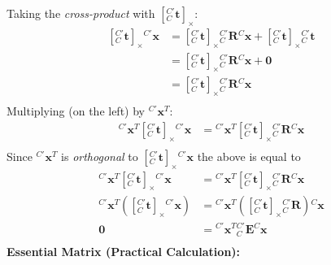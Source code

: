 \documentclass[a4paper,10pt]{article}
\newcommand{\spppnhx}[3]{\ensuremath{{^{#1}_{#2}}\mathbf{{{#3}}}}}
\begin{document}
\newline\noindent\newline\noindent
Taking the \emph{cross-product} with $[\spppnhx{C'}{C}{t}]_{\times}$:
\newline\noindent\newline\noindent
\begin{equation*}
\begin{split}
{[\spppnhx{C'}{C}{t}]_{\times}}{^{C'}\mathbf{x}} &= 
{[\spppnhx{C'}{C}{t}]_{\times}}{\spppnhx{C'}{C}{R}}{^{C}\mathbf{x}}+
{[\spppnhx{C'}{C}{t}]_{\times}}{\spppnhx{C'}{C}{t}}\\
&={[\spppnhx{C'}{C}{t}]_{\times}}{\spppnhx{C'}{C}{R}}{^{C}\mathbf{x}}+\mathbf{0}\\
&={[\spppnhx{C'}{C}{t}]_{\times}}{\spppnhx{C'}{C}{R}}{^{C}\mathbf{x}}\\
\end{split}
\end{equation*}
\newline\noindent\newline\noindent
Multiplying (on the left) by $^{C'}\mathbf{x}^{T}$:
\newline\noindent\newline\noindent
\begin{equation*}
\begin{split}
{^{C'}\mathbf{x}^{T}}{[\spppnhx{C'}{C}{t}]_{\times}}{^{C'}\mathbf{x}} &=
{^{C'}\mathbf{x}^{T}}{[\spppnhx{C'}{C}{t}]_{\times}}{\spppnhx{C'}{C}{R}}{^{C}\mathbf{x}}\\
\end{split}
\end{equation*}
Since $^{C'}\mathbf{x}^{T}$ is \emph{orthogonal} to ${[\spppnhx{C'}{C}{t}]_{\times}}{^{C'}\mathbf{x}}$ the above is equal to
\begin{equation*}
\begin{split}
{^{C'}\mathbf{x}^{T}}{[\spppnhx{C'}{C}{t}]_{\times}}{^{C'}\mathbf{x}} &=
{^{C'}\mathbf{x}^{T}}{[\spppnhx{C'}{C}{t}]_{\times}}{\spppnhx{C'}{C}{R}}{^{C}\mathbf{x}}\\
{^{C'}\mathbf{x}^{T}}\left({[\spppnhx{C'}{C}{t}]_{\times}}{^{C'}\mathbf{x}}\right) &=
{^{C'}\mathbf{x}^{T}}\left({[\spppnhx{C'}{C}{t}]_{\times}}{\spppnhx{C'}{C}{R}}\right){^{C}\mathbf{x}}\\
\mathbf{0}&={^{C'}\mathbf{x}^{T}}{^{C'}_{C}\mathbf{E}}{^{C}\mathbf{x}}\\
\end{split}
\end{equation*}
\newline\noindent\newline\noindent
\textbf{Essential Matrix (Practical Calculation):}
\newline\noindent
\end{document}
